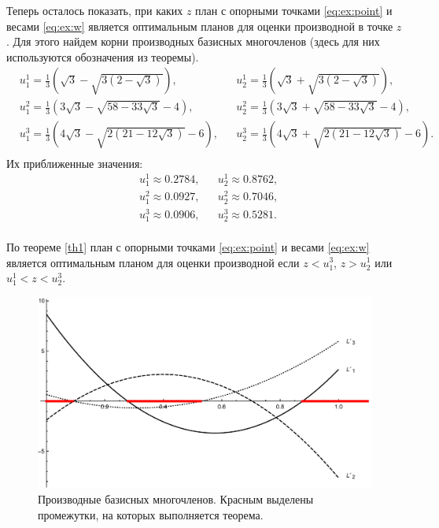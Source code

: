 \documentclass[specialist,
               substylefile = spbu.rtx,
               subf,href,colorlinks=true, 12pt]{disser}
\theoremstyle{definition}
\begin{document}
	Теперь осталось показать, при каких $z$ план с опорными точками \eqref{eq:ex:point} и весами \eqref{eq:ex:w} является оптимальным планов для оценки производной в точке $z$. Для этого найдем корни производных базисных многочленов (здесь для них используются обозначения из теоремы).
	\begin{align*}
		&u_1^1 = \frac{1}{3} \left(\sqrt{3}-\sqrt{3 \left(2-\sqrt{3}\right)}\right), &&u_2^1 = \frac{1}{3} \left(\sqrt{3}+\sqrt{3 \left(2-\sqrt{3}\right)}\right),\\
		&u_1^2 = \frac{1}{3} \left(3 \sqrt{3}-\sqrt{58-33 \sqrt{3}}-4\right), &&u_2^2 = \frac{1}{3} \left(3 \sqrt{3}+\sqrt{58-33 \sqrt{3}}-4\right), \\
		&u_1^3 = \frac{1}{3} \left(4 \sqrt{3}-\sqrt{2 \left(21-12 \sqrt{3}\right)}-6\right), &&u_2^3 = \frac{1}{3} \left(4 \sqrt{3}+\sqrt{2 \left(21-12 \sqrt{3}\right)}-6\right).\\
	\end{align*}
	Их приближенные значения:
	\begin{align*}
		&u_1^1 \approx 0.2784, &&u_2^1  \approx 0.8762,\\
		&u_1^2 \approx 0.0927, &&u_2^2 \approx 0.7046, \\
		&u_1^3 \approx 0.0906, &&u_2^3 \approx 0.5281.\\
	\end{align*}
	
	По теореме \ref{th1} план с опорными точками \eqref{eq:ex:point} и весами \eqref{eq:ex:w} является оптимальным планом для оценки производной если $z < u_1^3$, $z > u_2^1$ или $u_1^1 < z < u_2^3$.
	
	\begin{figure}
		\includegraphics[width=\textwidth]{fig/dl_color.pdf}
		\caption{Производные базисных многочленов. Красным выделены промежутки, на которых выполняется теорема.}
	\end{figure}
	
\end{document}
